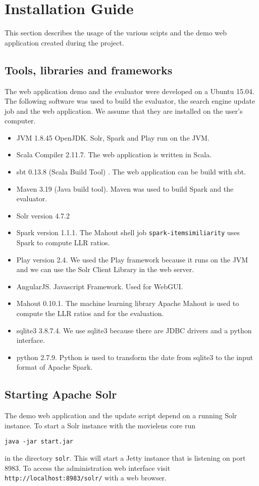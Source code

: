 \section{Installation Guide}
This section describes the usage of the various scipts and the demo web application created during the project.
\subsection{Tools, libraries and frameworks}
The web application demo and the evaluator were developed on a Ubuntu 15.04. 
The following software was used to build the evaluator, the search engine update job and the web application. We assume that they are installed on the user's computer.
\begin{itemize}
\item JVM 1.8.45 OpenJDK. Solr, Spark and Play run on the JVM.
\item Scala Compiler 2.11.7. The web application is written in Scala.
\item sbt 0.13.8 (Scala Build Tool) . The web application can be build with sbt.
\item Maven 3.19 (Java build tool). Maven was used to build Spark and the evaluator.
\item Solr version 4.7.2
\item Spark version 1.1.1. The Mahout shell job \verb|spark-itemsimiliarity| uses Spark to compute LLR ratios.
\item Play version 2.4. We used the Play framework because it runs on the JVM and we can use the Solr Client Library in the web server.
\item AngularJS. Javascript Framework. Used for WebGUI.
\item Mahout 0.10.1. The machine learning library Apache Mahout is used to compute the LLR ratios and for the evaluation.
\item sqlite3 3.8.7.4. We use sqlite3 because there are JDBC drivers and a python interface.
\item python 2.7.9. Python is used to transform the date from sqlite3 to the input format of Apache Spark.
\end{itemize}

\subsection{Starting Apache Solr}
\label{sec:startsolr}
The demo web application and the update script depend on a running Solr instance.
To start a Solr instance with the movielens core run
\begin{verbatim}
java -jar start.jar
\end{verbatim}
in the directory \verb|solr|.
This will start a Jetty instance that is listening on port 8983. To access the administration web interface visit \verb|http://localhost:8983/solr/| with a web browser.

